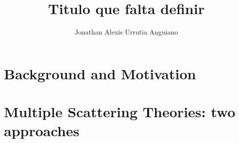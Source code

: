 \documentclass[11pt]{Latex/Classes/PhDthesisPSnPDF}
\author{Jonathan Alexis Urrutia Anguiano}
\title{Titulo que falta definir}
\begin{document}
%
\maketitle

%
\setcounter{secnumdepth}{3} %
\setcounter{tocdepth}{3}    %
 
\tableofcontents            %


\mainmatter
\def\baselinestretch{1}                   %


\chapter*{Background and Motivation}
	\label{chapter:intro}
	
		


\chapter{Multiple Scattering Theories: two approaches}
 	\label{ch:OpticalProperties}
	
\end{document}
